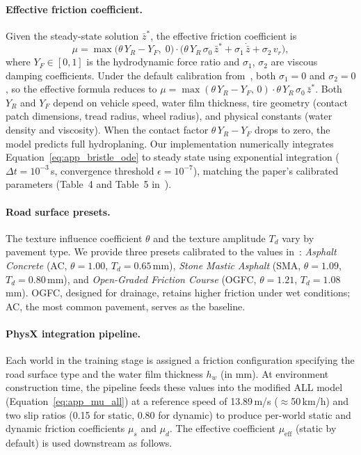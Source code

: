 \paragraph{Effective friction coefficient.}
Given the steady-state solution $\bar{z}^*$, the effective friction coefficient is
\begin{equation}
\label{eq:app_mu_all}
\mu = \max\!\bigl(\theta\,Y_R - Y_F,\; 0\bigr) \cdot \bigl(\theta\,Y_R\,\sigma_0\,\bar{z}^* + \sigma_1\,\dot{\bar{z}} + \sigma_2\,v_r\bigr),
\end{equation}
where $Y_F \in [0,1]$ is the hydrodynamic force ratio and $\sigma_1$, $\sigma_2$ are viscous damping coefficients.
Under the default calibration from~\cite{zhao_tire-pavement_2024}, both $\sigma_1 = 0$ and $\sigma_2 = 0$, so the effective formula reduces to $\mu = \max(\theta\,Y_R - Y_F,\,0)\cdot\theta\,Y_R\,\sigma_0\,\bar{z}^*$.
Both $Y_R$ and $Y_F$ depend on vehicle speed, water film thickness, tire geometry (contact patch dimensions, tread radius, wheel radius), and physical constants (water density and viscosity).
When the contact factor $\theta\,Y_R - Y_F$ drops to zero, the model predicts full hydroplaning.
Our implementation numerically integrates Equation~\ref{eq:app_bristle_ode} to steady state using exponential integration ($\Delta t = 10^{-3}$\,s, convergence threshold $\epsilon = 10^{-7}$), matching the paper's calibrated parameters (Table~4 and Table~5 in~\cite{zhao_tire-pavement_2024}).

\paragraph{Road surface presets.}
The texture influence coefficient $\theta$ and the texture amplitude $T_d$ vary by pavement type.
We provide three presets calibrated to the values in~\cite{zhao_tire-pavement_2024}:
\emph{Asphalt Concrete} (AC, $\theta{=}1.00$, $T_d{=}0.65$\,mm),
\emph{Stone Mastic Asphalt} (SMA, $\theta{=}1.09$, $T_d{=}0.80$\,mm), and
\emph{Open-Graded Friction Course} (OGFC, $\theta{=}1.21$, $T_d{=}1.08$\,mm).
OGFC, designed for drainage, retains higher friction under wet conditions; AC, the most common pavement, serves as the baseline.

\paragraph{PhysX integration pipeline.}
Each world in the training stage is assigned a friction configuration specifying the road surface type and the water film thickness $h_w$ (in mm).
At environment construction time, the pipeline feeds these values into the modified ALL model (Equation~\ref{eq:app_mu_all}) at a reference speed of 13.89\,m/s ($\approx$50\,km/h) and two slip ratios (0.15 for static, 0.80 for dynamic) to produce per-world static and dynamic friction coefficients $\mu_s$ and $\mu_d$.
The effective coefficient $\mu_{\mathrm{eff}}$ (static by default) is used downstream as follows.


